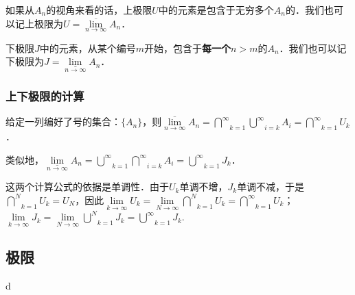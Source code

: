 如果从$A_n$的视角来看的话，上极限$U$中的元素是包含于无穷多个$A_n$的．我们也可以记上极限为$U=\overline{\lim}\limits_{n\rightarrow \infty}A_n$．

下极限$J$中的元素，从某个编号$m$开始，包含于\textbf{每一个}$n>m$的$A_n$．我们也可以记下极限为$J=\underline{\lim}\limits_{n\rightarrow \infty}A_n$．

\subsubsection{上下极限的计算}
给定一列编好了号的集合：$\{A_n\}$，则$\overline{\lim}\limits_{n\rightarrow \infty}A_n=\overset{\infty}\bigcap\limits_{k=1}\overset{\infty}\bigcup\limits_{i=k}A_i=\overset{\infty}\bigcap\limits_{k=1}U_k$．

类似地，$\underline{\lim}\limits_{n\rightarrow \infty}A_n=\overset{\infty}\bigcup\limits_{k=1}\overset{\infty}\bigcap\limits_{i=k}A_i=\overset{\infty}\bigcup\limits_{k=1}J_k$．

这两个计算公式的依据是单调性．由于$U_k$单调不增，$J_k$单调不减，于是$\overset{N}\bigcap\limits_{k=1}U_k=U_N$，因此$\lim\limits_{k\rightarrow\infty}U_k=\lim\limits_{N\rightarrow\infty}\overset{N}\bigcap\limits_{k=1}U_k=\overset{\infty}\bigcap\limits_{k=1}U_k$；$\lim\limits_{k\rightarrow\infty}J_k=\lim\limits_{N\rightarrow\infty}\overset{N}\bigcup\limits_{k=1}J_k=\overset{\infty}\bigcup\limits_{k=1}J_k$.

\subsection{极限}

d 